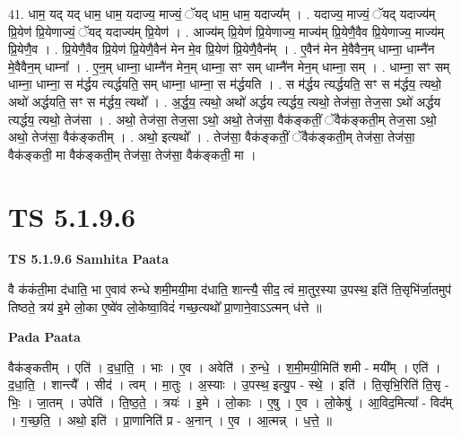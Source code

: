 \documentclass[17pt]{extarticle}
\begin{document}
41. धाम॒ यद् यद् धाम॒ धाम॒ यदाज्य॒ माज्यं॒ ॅयद् धाम॒ धाम॒ यदाज्य᳚म् । . यदाज्य॒ माज्यं॒ ॅयद् यदाज्य॑म् प्रि॒येण॑ प्रि॒येणाज्यं॒ ॅयद् यदाज्य॑म् प्रि॒येण॑ । . आज्य॑म् प्रि॒येण॑ प्रि॒येणाज्य॒ माज्य॑म् प्रि॒येणै॒वैव प्रि॒येणाज्य॒ माज्य॑म् प्रि॒येणै॒व । . प्रि॒येणै॒वैव प्रि॒येण॑ प्रि॒येणै॒वैन॑ मेन मे॒व प्रि॒येण॑ प्रि॒येणै॒वैन᳚म् । . ए॒वैन॑ मेन मे॒वैवैन॒म् धाम्ना॒ धाम्नै॑न मे॒वैवैन॒म् धाम्ना᳚ । . ए॒न॒म् धाम्ना॒ धाम्नै॑न मेन॒म् धाम्ना॒ सꣳ सम् धाम्नै॑न मेन॒म् धाम्ना॒ सम् । . धाम्ना॒ सꣳ सम् धाम्ना॒ धाम्ना॒ स म॑र्द्धय त्यर्द्धयति॒ सम् धाम्ना॒ धाम्ना॒ स म॑र्द्धयति । . स म॑र्द्धय त्यर्द्धयति॒ सꣳ स म॑र्द्धय॒ त्यथो॒ अथो॑ अर्द्धयति॒ सꣳ स म॑र्द्धय॒ त्यथो᳚ । . अ॒र्द्ध॒य॒ त्यथो॒ अथो॑ अर्द्धय त्यर्द्धय॒ त्यथो॒ तेज॑सा॒ तेज॒सा ऽथो॑ अर्द्धय त्यर्द्धय॒ त्यथो॒ तेज॑सा । . अथो॒ तेज॑सा॒ तेज॒सा ऽथो॒ अथो॒ तेज॑सा॒ वैक॑ङ्कतीं॒ ॅवैक॑ङ्कती॒म् तेज॒सा ऽथो॒ अथो॒ तेज॑सा॒ वैक॑ङ्कतीम् । . अथो॒ इत्यथो᳚ । . तेज॑सा॒ वैक॑ङ्कतीं॒ ॅवैक॑ङ्कती॒म् तेज॑सा॒ तेज॑सा॒ वैक॑ङ्कती॒ मा वैक॑ङ्कती॒म् तेज॑सा॒ तेज॑सा॒ वैक॑ङ्कती॒ मा । \newline
\pagebreak
{}

\section{ TS 5.1.9.6 }

\textbf{TS 5.1.9.6 } \newline
\textbf{Samhita Paata} \newline

वै क॑कंती॒मा द॑धाति॒ भा ए॒वाव॑ रुन्धे शमी॒मयी॒मा द॑धाति॒ शान्त्यै॒ सीद॒ त्वं मा॒तुर॒स्या उ॒पस्थ॒ इति॑ ति॒सृभि॑र्जा॒तमुप॑ तिष्ठते॒ त्रय॑ इ॒मे लो॒का ए॒ष्वे॑व लो॒केष्वा॒विदं॑ गच्छ॒त्यथो᳚ प्रा॒णाने॒वाऽऽत्मन् ध॑त्ते ॥ \newline

\textbf{Pada Paata} \newline

वैक॑ङ्कतीम् । एति॑ । द॒धा॒ति॒ । भाः । ए॒व । अवेति॑ । रु॒न्धे॒ । श॒मी॒मयी॒मिति॑ शमी - मयी᳚म् । एति॑ । द॒धा॒ति॒ । शान्त्यै᳚ । सीद॑ । त्वम् । मा॒तुः । अ॒स्याः । उ॒पस्थ॒ इत्यु॒प - स्थे॒ । इति॑ । ति॒सृभि॒रिति॑ ति॒सृ - भिः॒ । जा॒तम् । उपेति॑ । ति॒ष्ठ॒ते॒ । त्रयः॑ । इ॒मे । लो॒काः । ए॒षु । ए॒व । लो॒केषु॑ । आ॒विद॒मित्या᳚ - विद᳚म् । ग॒च्छ॒ति॒ । अथो॒ इति॑ । प्रा॒णानिति॑ प्र - अ॒नान् । ए॒व । आ॒त्मन्न् । ध॒त्ते॒ ॥  \newline
\end{document}
